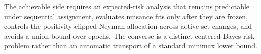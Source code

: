 The achievable side requires an expected-risk analysis that remains predictable under sequential assignment, evaluates nuisance fits only after they are frozen, controls the positivity-clipped Neyman allocation across active-set changes, and avoids a union bound over epochs.  The converse is a distinct centered Bayes-risk problem rather than an automatic transport of a standard minimax lower bound.